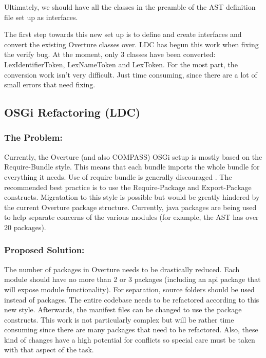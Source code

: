 \documentclass[11pt]{report}
\begin{document}
    Ultimately, we should have all the classes in the preamble of the AST definition
    file set up as interfaces.

    The first step towards this new set up is to define and create interfaces and
    convert the existing Overture classes over. LDC has begun this work when fixing
    the verify bug. At the moment, only 3 classes have been converted:
    \textsf{LexIdentifierToken}, \textsf{LexNameToken} and \textsf{LexToken}. For 
    the most part, the conversion work isn't very difficult. Just time consuming, 
    since there are a lot of small errors that need fixing.
    
    


    \subsection*{OSGi Refactoring (LDC)}
    \label{ssec:osgi} 

    \subsubsection{The Problem:}
    Currently, the Overture (and also COMPASS) OSGi setup is mostly based on the 
    \textsf{Require-Bundle} style. This means that each bundle imports the whole 
    bundle for everything it needs. Use of require bundle is generally discouraged
    \cite{osgi2013}. The recommended best practice is to use the 
    \textsf{Require-Package} and \textsf{Export-Package} constructs. Migratation
    to this style is possible but would be greatly hindered by the current Overture
    package structure. Currently, java packages are being used to help separate
    concerns of the various modules (for example, the AST has over 20 packages).

    \subsubsection{Proposed Solution:}
    The number of packages in Overture needs to be drastically reduced. Each
    module should have no more than 2 or 3 packages (including an api package
    that will expose module functionality). For separation, source folders
    should be used instead of packages. The entire codebase needs to be
    refactored according to this new style. Afterwards, the manifest files can
    be changed to use the package constructs. This work is not particularly
    complex but will be rather time consuming since there are many packages
    that need to be refactored. Also, these kind of changes have a high
    potential for conflicts so special care must be taken with that aspect of
    the task.
\end{document}
